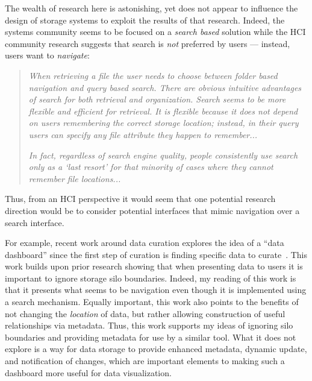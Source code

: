 The wealth of research here is astonishing, yet does not appear to influence the
design of storage systems to exploit the results of that research.  Indeed, the
systems community seems to be focused on a \emph{search based} solution while
the HCI community research suggests that search is \emph{not} preferred by users
--- instead, users want to \emph{navigate}:

\begin{quotation}
    \emph{When retrieving a file the user needs to choose between folder
        based navigation and query based search. There are obvious
        intuitive advantages of search for both retrieval and organization.
        Search seems to be more flexible and efficient for
        retrieval. It is flexible because it does not depend on users
        remembering the correct storage location; instead, in their
        query users can specify any file attribute they happen to
        remember...}

    \emph{In fact, regardless of search engine quality,
        people consistently use search only as a ‘last resort’ for that
        minority of cases where they cannot remember file
        locations...}~\cite{bergman2019search}

\end{quotation}

Thus, from an HCI perspective it would seem that one potential research
direction would be to consider potential interfaces that mimic navigation over a
search interface.

For example, recent work around data curation explores the idea of a ``data
dashboard'' since the first step of curation is finding specific data to
curate~\cite{Vitale_2020}. This work builds upon prior research showing that
when presenting data to users it is important to ignore storage silo boundaries.
Indeed, my reading of this work is that it presents what seems to be navigation
even though it is implemented using a search mechanism.  Equally important, this
work also points to the benefits of not changing the \emph{location} of data,
but rather allowing construction of useful relationships via metadata. Thus,
this work supports my ideas of ignoring silo boundaries and providing metadata
for use by a similar tool.  What it does not explore is a way for data storage
to provide enhanced metadata, dynamic update, and notification of changes, which
are important elements to making such a dashboard more useful for data
visualization.




